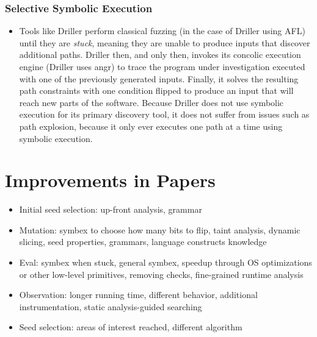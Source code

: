 \documentclass{article}
\begin{document}
\subsubsection{Selective Symbolic Execution}
\begin{itemize}
    \item Tools like Driller\cite{Driller} perform classical fuzzing (in the case of Driller using AFL\cite{AFLPlusPlus}) until they are \textit{stuck}, meaning they are unable to produce inputs that discover additional paths. Driller then, and only then, invokes its concolic execution engine (Driller uses angr\cite{angr}) to trace the program under investigation executed with one of the previously generated inputs. Finally, it solves the resulting path constraints with one condition flipped to produce an input that will reach new parts of the software. Because Driller does not use symbolic execution for its primary discovery tool, it does not suffer from issues such as path explosion, because it only ever executes one path at a time using symbolic execution.
\end{itemize}

\section{Improvements in Papers}
\begin{itemize}
    \item Initial seed selection: up-front analysis\cite{Skyfire, Orthrus, DIFUZE}, grammar\cite{QuickFuzz, QuickFuzz2}
    \item Mutation: symbex to choose how many bits to flip\cite{SYMFUZZ}, taint analysis\cite{Mayhem, Angora, Steelix, VUzzer}, dynamic slicing\cite{MutaGen}, seed properties\cite{SDF}, grammars\cite{SCADA, IMF}, language constructs knowledge\cite{Chizpurfle}
    \item Eval: symbex when stuck\cite{Driller, Mayhem}, general symbex\cite{S2F}, speedup through OS optimizations\cite{OS} or other low-level primitives\cite{IMF, VDF, kAFL}, removing checks\cite{TFuzz}, fine-grained runtime analysis\cite{MEDS}
    \item Observation: longer running time\cite{SlowFuzz}, different behavior\cite{NEZHA}, additional instrumentation\cite{Steelix, Angora}, static analysis-guided searching\cite{Dowser, VUzzer}
    \item Seed selection: areas of interest reached\cite{AFLGo, CGF, FairFuzz, VUzzer}, different algorithm\cite{SeedSelection, Scheduling}
\end{itemize}
\end{document}
